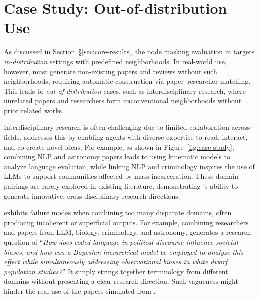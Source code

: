 \vspace{-2mm}
\section{Case Study: Out-of-distribution Use}
\label{case-study-section}

As discussed in Section~\S\ref{sec:core-results}, the node masking evaluation in \envname targets \textit{in-distribution} settings with predefined neighborhoods. In real-world use, however, \envname must generate non-existing papers and reviews without such neighborhoods, requiring automatic construction via paper–researcher matching. This leads to \textit{out-of-distribution} cases, such as interdisciplinary research, where unrelated papers and researchers form unconventional neighborhoods without prior related works.

 Interdisciplinary research is often challenging due to limited collaboration across fields. \envname addresses this by enabling agents with diverse expertise to read, interact, and co-create novel ideas. For example, as shown in Figure~\ref{fig:case-study}, combining NLP and astronomy papers leads to using kinematic models to analyze language evolution, while linking NLP and criminology inspires the use of LLMs to support communities affected by mass incarceration. These domain pairings are rarely explored in existing literature, demonstrating \envname’s ability to generate innovative, cross-disciplinary research directions.

\envname exhibits failure modes when combining too many disparate domains, often producing incoherent or superficial outputs. For example, combining researchers and papers from LLM, biology, criminology, and astronomy, \envname generates a research question of ``\textit{How does coded language in political discourse influence societal biases, and how can a Bayesian hierarchical model be employed to analyze this effect while simultaneously addressing observational biases in white dwarf population studies?}'' It simply strings together terminology from different domains without presenting a clear research direction. Such vagueness might hinder the real use of the papers simulated from \envname. 



